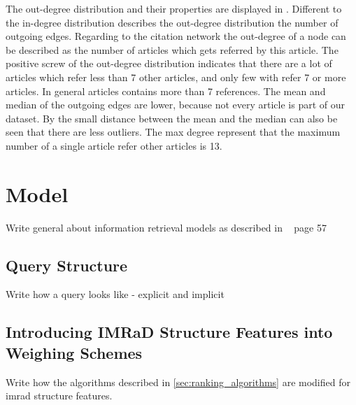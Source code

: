 The out-degree distribution and their properties are displayed in . Different to the in-degree distribution describes the out-degree distribution the number of outgoing edges. Regarding to the citation network the out-degree of a node can be described as the number of articles which gets referred by this article. The positive screw of the out-degree distribution indicates that there are a lot of articles which refer less than 7 other articles, and only few with refer 7 or more articles. In general articles contains more than 7 references. The mean and median of the outgoing edges are lower, because not every article is part of our dataset. By the small distance between the mean and the median can also be seen that there are less outliers. The max degree represent that the maximum number of a single article refer other articles is 13.

\section{Model}
\label{sec:model}

Write general about information retrieval models as described in ~\cite{ModernInvormationRetrieval1999} page 57

\subsection{Query Structure}

Write how a query looks like - explicit and implicit

\subsection{Introducing IMRaD Structure Features into Weighing Schemes}

Write how the algorithms described in \cref{sec:ranking_algorithms} are modified for imrad structure features.

